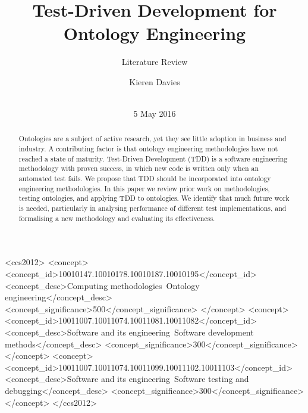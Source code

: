 \documentclass{sig-alternate}
\begin{document}
\title{Test-Driven Development for Ontology Engineering}
\subtitle{Literature Review}
\author{
  \alignauthor
  Kieren Davies\\
   \\
}
\date{5 May 2016}
\maketitle

\begin{abstract}
Ontologies are a subject of active research, yet they see little adoption in business and industry.  A contributing factor is that ontology engineering methodologies have not reached a state of maturity.  Test-Driven Development (TDD) is a software engineering methodology with proven success, in which new code is written only when an automated test fails.  We propose that TDD should be incorporated into ontology engineering methodologies.  In this paper we review prior work on methodologies, testing ontologies, and applying TDD to ontologies.  We identify that much future work is needed, particularly in analysing performance of different test implementations, and formalising a new methodology and evaluating its effectiveness.
\end{abstract}

\begin{CCSXML}
<ccs2012>
  <concept>
    <concept_id>10010147.10010178.10010187.10010195</concept_id>
    <concept_desc>Computing methodologies~Ontology engineering</concept_desc>
    <concept_significance>500</concept_significance>
  </concept>
  <concept>
    <concept_id>10011007.10011074.10011081.10011082</concept_id>
    <concept_desc>Software and its engineering~Software development methods</concept_desc>
    <concept_significance>300</concept_significance>
  </concept>
  <concept>
    <concept_id>10011007.10011074.10011099.10011102.10011103</concept_id>
    <concept_desc>Software and its engineering~Software testing and debugging</concept_desc>
    <concept_significance>300</concept_significance>
  </concept>
</ccs2012>
\end{CCSXML}

\printccsdesc

\end{document}
